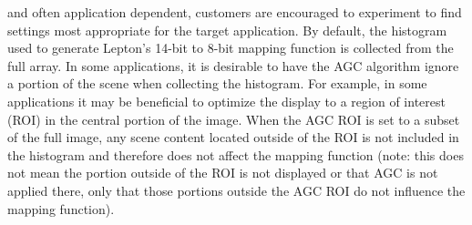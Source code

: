 and often application dependent, customers are encouraged to experiment to find
settings most appropriate for the target application. By default, the histogram
used to generate Lepton's 14-bit to 8-bit mapping function is collected from the
full array. In some applications, it is desirable to have the AGC algorithm
ignore a portion of the scene when collecting the histogram. For example, in
some applications it may be beneficial to optimize the display to a region of
interest (ROI) in the central portion of the image. When the AGC ROI is set to a
subset of the full image, any scene content located outside of the ROI is not
included in the histogram and therefore does not affect the mapping function
(note: this does not mean the portion outside of the ROI is not displayed or
that AGC is not applied there, only that those portions outside the AGC ROI do
not influence the mapping function).\cite{flirdatasheet}
%
